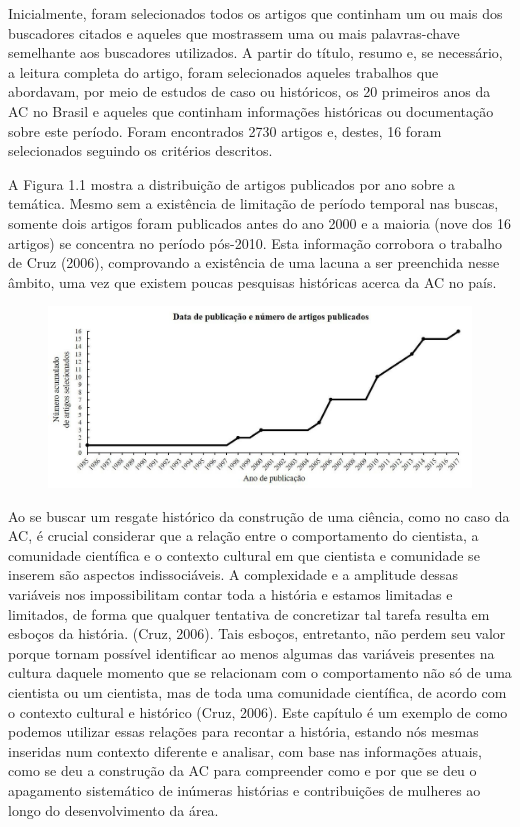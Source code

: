 Inicialmente, foram selecionados todos os artigos que continham um ou mais dos buscadores citados e aqueles que mostrassem uma ou mais palavras-chave semelhante aos buscadores utilizados.  A partir do título, resumo e, se necessário, a leitura completa do artigo, foram selecionados aqueles trabalhos que abordavam, por meio de estudos de caso ou históricos, os 20 primeiros anos da AC no Brasil e aqueles que continham informações históricas ou documentação sobre este período. Foram encontrados 2730 artigos e, destes, 16 foram selecionados seguindo os critérios descritos. 

A Figura 1.1 mostra a distribuição de artigos publicados por ano sobre a temática. Mesmo sem a existência de limitação de período temporal nas buscas, somente dois artigos foram publicados antes do ano 2000 e a maioria (nove dos 16 artigos) se concentra no período pós-2010. Esta informação corrobora o trabalho de Cruz (2006), comprovando a existência de uma lacuna a ser preenchida nesse âmbito, uma vez que existem poucas pesquisas históricas acerca da AC no país. 

\begin{figure}[h]
\includegraphics[width=1\textwidth]{1/figura1}
\end{figure}

Ao se buscar um resgate histórico da construção de uma ciência, como no caso da AC, é crucial considerar que a relação entre o comportamento do cientista, a comunidade científica e o contexto cultural em que cientista e comunidade se inserem são aspectos indissociáveis. A complexidade e a amplitude dessas variáveis nos impossibilitam contar toda a história e estamos limitadas e limitados, de forma que qualquer tentativa de concretizar tal tarefa resulta em esboços da história. (Cruz, 2006). Tais esboços, entretanto, não perdem seu valor porque tornam possível identificar ao menos algumas das variáveis presentes na cultura daquele momento que se relacionam com o comportamento não só de uma cientista ou um cientista, mas de toda uma comunidade científica, de acordo com o contexto cultural e histórico (Cruz, 2006). Este capítulo é um exemplo de como podemos utilizar essas relações para recontar a história, estando nós mesmas inseridas num contexto diferente e analisar, com base nas informações atuais, como se deu a construção da AC para compreender como e por que se deu o apagamento sistemático de inúmeras histórias e contribuições de mulheres ao longo do desenvolvimento da área.

